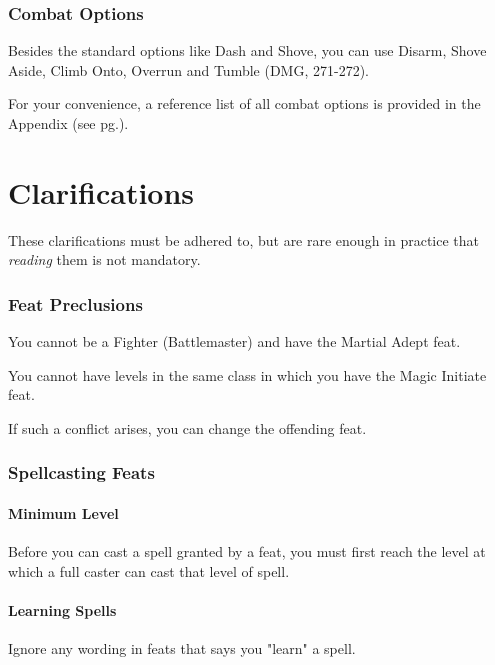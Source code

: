 \documentclass[letterpaper,twocolumn,openany,nodeprecatedcode]{dndbook}
\newcommand{\pg}[1]{pg.\pageref{#1}}
\newcommand{\see}[1]{(see \pg{#1})}
\begin{document}
\subsection{Combat Options}
Besides the standard options like Dash and Shove, you can use Disarm, Shove Aside, Climb Onto, Overrun and Tumble (DMG, 271-272). 

For your convenience, a reference list of all combat options is provided in the Appendix \see{combat-options}.















\chapter{Clarifications}

\noindent These clarifications must be adhered to, but are rare enough in practice that \textit{reading} them is not mandatory.

\subsection{Feat Preclusions}
You cannot be a Fighter (Battlemaster) and have the Martial Adept feat.

You cannot have levels in the same class in which you have the Magic Initiate feat.

If such a conflict arises, you can change the offending feat.

\subsection{Spellcasting Feats}

\subsubsection{Minimum Level}
Before you can cast a spell granted by a feat, you must first reach the level at which a full caster can cast that level of spell.

\subsubsection{Learning Spells}
Ignore any wording in feats that says you "learn" a spell.
\end{document}
